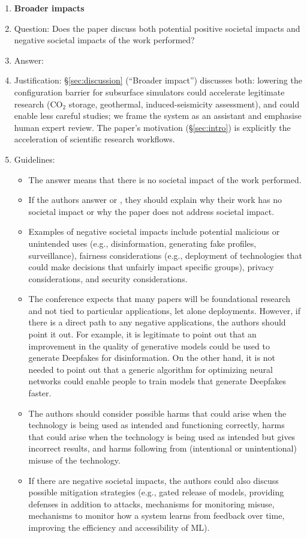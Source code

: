\begin{enumerate}
\item {\bf Broader impacts}
    \item[] Question: Does the paper discuss both potential positive societal impacts and negative societal impacts of the work performed?
    \item[] Answer: \answerYes{}
    \item[] Justification: \S\ref{sec:discussion} (``Broader impact'') discusses both: lowering the configuration barrier for subsurface simulators could accelerate legitimate research (CO$_2$ storage, geothermal, induced-seismicity assessment), and could enable less careful studies; we frame the system as an assistant and emphasise human expert review. The paper's motivation (\S\ref{sec:intro}) is explicitly the acceleration of scientific research workflows.
    \item[] Guidelines:
    \begin{itemize}
        \item The answer \answerNA{} means that there is no societal impact of the work performed.
        \item If the authors answer \answerNA{} or \answerNo, they should explain why their work has no societal impact or why the paper does not address societal impact.
        \item Examples of negative societal impacts include potential malicious or unintended uses (e.g., disinformation, generating fake profiles, surveillance), fairness considerations (e.g., deployment of technologies that could make decisions that unfairly impact specific groups), privacy considerations, and security considerations.
        \item The conference expects that many papers will be foundational research and not tied to particular applications, let alone deployments. However, if there is a direct path to any negative applications, the authors should point it out. For example, it is legitimate to point out that an improvement in the quality of generative models could be used to generate Deepfakes for disinformation. On the other hand, it is not needed to point out that a generic algorithm for optimizing neural networks could enable people to train models that generate Deepfakes faster.
        \item The authors should consider possible harms that could arise when the technology is being used as intended and functioning correctly, harms that could arise when the technology is being used as intended but gives incorrect results, and harms following from (intentional or unintentional) misuse of the technology.
        \item If there are negative societal impacts, the authors could also discuss possible mitigation strategies (e.g., gated release of models, providing defenses in addition to attacks, mechanisms for monitoring misuse, mechanisms to monitor how a system learns from feedback over time, improving the efficiency and accessibility of ML).
    \end{itemize}


\end{enumerate}
